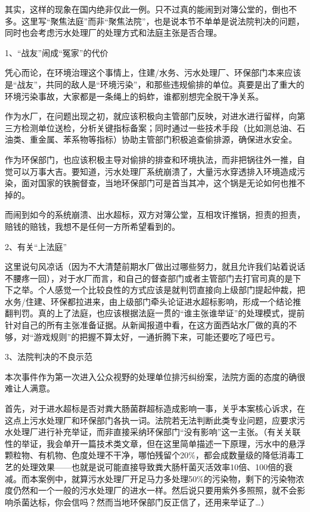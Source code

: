 \documentclass[]{book}
\begin{document}
其实，这样的现象在国内绝非仅此一例。只不过真的能闹到对簿公堂的，倒也不多。这里写``聚焦法庭''而非``聚焦法院''，也是说本节不单单是说法院判决的问题，同时也会考虑污水处理厂的处理方式和法庭主张是否合理。

1、``战友''闹成``冤家''的代价

凭心而论，在环境治理这个事情上，住建/水务、污水处理厂、环保部门本来应该是``战友''，共同的敌人是``环境污染''，和那些违规偷排的单位。真要是出了重大的环境污染事故，大家都是一条绳上的蚂蚱，谁都别想完全脱干净关系。

作为水厂，在问题出现之初，就应该积极向主管部门反映，对进水进行留样，向第三方检测单位送检，分析关键指标备案；同时通过一些技术手段（比如测总油、石油类、重金属、苯系物等指标）协助主管部门积极追查偷排源，确保进水安全。

作为环保部门，也应该积极主导对偷排的排查和环境执法，而非把锅往外一推，自觉可以万事大吉。要知道，污水处理厂系统崩溃了，大量污水穿透排入环境造成污染，面对国家的铁腕督查，当地环保部门可是首当其冲，这个锅是无论如何也推不掉的。

而闹到如今的系统崩溃、出水超标，双方对簿公堂，互相攻讦推锅，担责的担责，赔钱的赔钱，我想不是任何一方所希望看到的。

2、有关``上法庭''

这里说句风凉话（因为不大清楚前期水厂做出过哪些努力，就且允许我们站着说话不腰疼一回），对于水厂而言，和自己的督查部门或者主管部门去打官司真的是下下之举。个人感觉一个比较良性的方式应该是就判罚直接向上级部门提起仲裁，把水务/住建、环保都拉进来，由上级部门牵头论证进水超标影响，形成一个结论推翻判罚。真的上了法庭，也应该根据法庭一贯的``谁主张谁举证''的处理模式，提前针对自己的所有主张准备证据。从新闻报道中看，在这方面西站水厂做的真的不够，对``游戏规则''的把握不算太好，一通折腾下来，可能还要吃了哑巴亏。

3、法院判决的不良示范

本次事件作为第一次进入公众视野的处理单位排污纠纷案，法院方面的态度的确很难让人满意。

首先，对于进水超标是否对粪大肠菌群超标造成影响一事，关乎本案核心诉求，在这点上污水处理厂和环保部门各执一词。法院若无法判断此类专业问题，应要求污水处理厂进行补充举证，而非直接采纳环保部门``没有影响''这一主张。（有关关联性的举证，我会单开一篇技术类文章，但在这里简单描述一下原理，污水中的悬浮颗粒物、有机物、色度处理不干净，哪怕残留个20\%，都会成数量级的降低消毒工艺的处理效果------也就是说可能直接导致粪大肠杆菌灭活效率10倍、100倍的衰减。而本案例中，就算污水处理厂开足马力多处理50\%的污染物，剩下的污染物浓度仍然和一个一般的污水处理厂的进水一样。然后说只要用紫外多照照，就不会影响杀菌达标，你会信吗？然而当地环保部门反正信了，还用来举证了\ldots{}）
\end{document}
